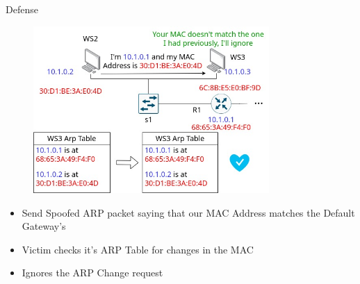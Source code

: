 \documentclass{beamer}
\begin{document}
\begin{frame}
\begin{columns}
    \begin{column}{0.5\textwidth}
        \Large Defense
        \begin{figure}
            \centering
            \includegraphics[width=0.8\textwidth]{arp_defense.jpg}\\
        \end{figure}
            \begin{itemize}[label={}]
                \item \footnotesize Send Spoofed ARP packet saying that our MAC Address matches the Default Gateway's
                \item \footnotesize Victim checks it's ARP Table for changes in the MAC
                \item \footnotesize Ignores the ARP Change request
            \end{itemize}
    \end{column}
\end{columns}
\end{frame}
\end{document}
